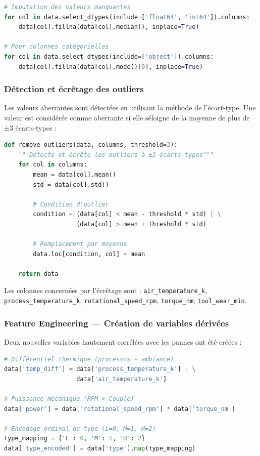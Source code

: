\documentclass[a4paper,12pt]{report}
\begin{document}
\begin{lstlisting}[language=Python]
# Imputation des valeurs manquantes
for col in data.select_dtypes(include=['float64', 'int64']).columns:
    data[col].fillna(data[col].median(), inplace=True)

# Pour colonnes catégorielles
for col in data.select_dtypes(include=['object']).columns:
    data[col].fillna(data[col].mode()[0], inplace=True)
\end{lstlisting}

\subsubsection{Détection et écrêtage des outliers}

Les valeurs aberrantes sont détectées en utilisant la méthode de l'écart-type. Une valeur est considérée comme aberrante si elle séloigne de la moyenne de plus de ±3 écarts-types :

\begin{lstlisting}[language=Python]
def remove_outliers(data, columns, threshold=3):
    """Détecte et écrête les outliers à ±3 écarts-types"""
    for col in columns:
        mean = data[col].mean()
        std = data[col].std()
        
        # Condition d'outlier
        condition = (data[col] < mean - threshold * std) | \
                    (data[col] > mean + threshold * std)
        
        # Remplacement par moyenne
        data.loc[condition, col] = mean
    
    return data
\end{lstlisting}

Les colonnes concernées par l'écrêtage sont : \texttt{air\_temperature\_k}, \texttt{process\_temperature\_k}, \texttt{rotational\_speed\_rpm}, \texttt{torque\_nm}, \texttt{tool\_wear\_min}.

\subsubsection{Feature Engineering — Création de variables dérivées}

Deux nouvelles variables hautement corrélées avec les pannes ont été créées :

\begin{lstlisting}[language=Python]
# Différentiel thermique (processus - ambiance)
data['temp_diff'] = data['process_temperature_k'] - \
                    data['air_temperature_k']

# Puissance mécanique (RPM × Couple)
data['power'] = data['rotational_speed_rpm'] * data['torque_nm']

# Encodage ordinal du type (L=0, M=1, H=2)
type_mapping = {'L': 0, 'M': 1, 'H': 2}
data['type_encoded'] = data['type'].map(type_mapping)
\end{lstlisting}
\end{document}
